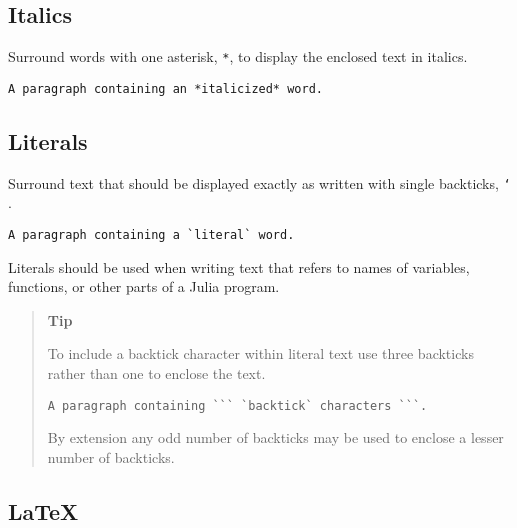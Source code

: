 \hypertarget{4277603997710742460}{}


\subsection{Italics}



Surround words with one asterisk, \texttt{*}, to display the enclosed text in italics.




\begin{lstlisting}
A paragraph containing an *italicized* word.
\end{lstlisting}



\hypertarget{6850088772867679045}{}


\subsection{Literals}



Surround text that should be displayed exactly as written with single backticks, \texttt{`} .




\begin{lstlisting}
A paragraph containing a `literal` word.
\end{lstlisting}



Literals should be used when writing text that refers to names of variables, functions, or other parts of a Julia program.



\begin{quote}
\textbf{Tip}

To include a backtick character within literal text use three backticks rather than one to enclose the text.


\begin{lstlisting}
A paragraph containing ``` `backtick` characters ```.
\end{lstlisting}

By extension any odd number of backticks may be used to enclose a lesser number of backticks.

\end{quote}


\hypertarget{6917271240677862304}{}


\subsection{ \LaTeX }



